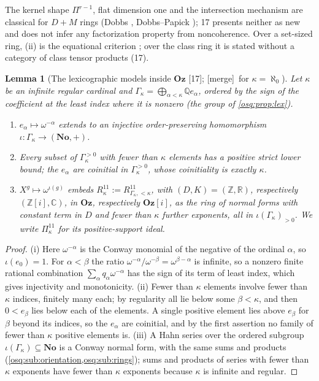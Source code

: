 \documentclass[11pt,letterpaper]{article}
\numberwithin{equation}{section}
\newtheorem{lemma}[lemma]{Lemma}
\theoremstyle{definition}
\theoremstyle{remark}
\theoremstyle{plain}
\newcommand{\No}{\mathbf{No}}
\newcommand{\Oz}{\mathbf{Oz}}
\newcommand{\GOz}{\Oz[i]}
\newcommand{\Z}{\mathbb Z}
\newcommand{\Q}{\mathbb Q}
\newcommand{\R}{\mathbb R}
\newcommand{\C}{\mathbb C}
\newcommand{\src}[1]{\textup{\textsf{[#1]}}}
\newcommand{\merge}{\textup{\textsf{[merge]}}}
\begin{document}
The kernel shape $\Pi^{r-1}$, flat dimension one and the intersection mechanism are classical for $D+M$ rings (Dobbs
\cite{Dobbs}, Dobbs--Papick \cite{DobbsPapick}); 17 presents neither as new and does not infer any factorization property from
noncoherence. Over a set-sized ring, (ii) is the equational criterion \cite[Lemma~10.39.11]{StacksFlat}; over the class ring it is
stated without a category of class tensor products (17).

\begin{lemma}[The lexicographic models inside $\Oz$ \src{17}; \merge\ for $\kappa=\aleph_0$]\label{osq:rel:lem:embedding}
Let $\kappa$ be an infinite regular cardinal and $\Gamma_\kappa=\bigoplus_{\alpha<\kappa}\Q e_\alpha$, ordered by the sign of the
coefficient at the least index where it is nonzero (the group of \cref{osq:prop:lex}).
\begin{enumerate}
\item $e_\alpha\mapsto\omega^{-\alpha}$ extends to an injective order-preserving homomorphism $\iota:\Gamma_\kappa\to(\No,+)$.
\item Every subset of $\Gamma_\kappa^{>0}$ with fewer than $\kappa$ elements has a positive strict lower bound; the $e_\alpha$ are
coinitial in $\Gamma_\kappa^{>0}$, whose coinitiality is exactly $\kappa$.
\item $X^g\mapsto\omega^{\iota(g)}$ embeds $R^{11}_\kappa:=R^{11}_{\Gamma_\kappa,<\kappa}$, with $(D,K)=(\Z,\R)$, respectively
$(\Z[i],\C)$, in $\Oz$, respectively $\GOz$, as the ring of normal forms with constant term in $D$ and fewer than $\kappa$
further exponents, all in $\iota(\Gamma_\kappa)_{>0}$. We write $\Pi^{11}_\kappa$ for its positive-support ideal.
\end{enumerate}
\end{lemma}
\begin{proof}
(i) Here $\omega^{-\alpha}$ is the Conway monomial of the negative of the ordinal $\alpha$, so $\iota(e_0)=1$. For $\alpha<\beta$ the
ratio $\omega^{-\alpha}/\omega^{-\beta}=\omega^{\beta-\alpha}$ is infinite, so a nonzero finite rational combination
$\sum_\alpha q_\alpha\omega^{-\alpha}$ has the sign of its term of least index, which gives injectivity and monotonicity.
(ii) Fewer than $\kappa$ elements involve fewer than $\kappa$ indices, finitely many each; by regularity all lie below some
$\beta<\kappa$, and then $0<e_\beta$ lies below each of the elements. A single positive element lies above $e_\beta$ for $\beta$
beyond its indices, so the $e_\alpha$ are coinitial, and by the first assertion no family of fewer than $\kappa$ positive
elements is. (iii) A Hahn series over the ordered subgroup $\iota(\Gamma_\kappa)\subseteq\No$ is a Conway normal form, with the
same sums and products (\cref{osq:sub:orientation,osq:sub:rings}); sums and products of series with fewer than $\kappa$ exponents
have fewer than $\kappa$ exponents because $\kappa$ is infinite and regular.
\end{proof}
\end{document}
